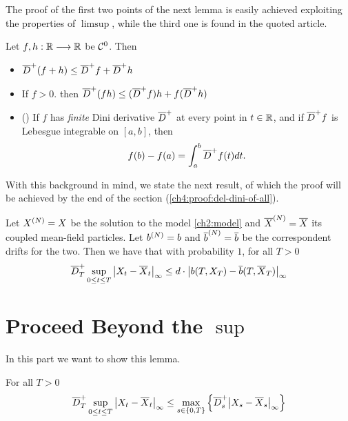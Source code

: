 The proof of the first two points of the next lemma is easily achieved exploiting the properties of $\limsup$, while the third one is found in the quoted article.

\begin{lemma}
	Let $f,h: \mathbb{R} \longrightarrow \mathbb{R}$ be $\mathcal{C}^0$.
	Then
	\begin{itemize}
		\item $\overline{D}^+ (f + h) \leq \overline{D}^+ f + \overline{D}^+h$
		\item If $f > 0$. then $\overline{D}^+ (fh) \leq (\overline{D}^+f) h + f(\overline{D}^+h)$
		\item (\autocite[Theorem 11]{dini-derivatives}) If $f$ has \emph{finite} Dini derivative $\overline{D}^+$ at every point in $t\in\mathbb{R}$, and if $\overline{D}^+f$ is Lebesgue integrable on $[a,b]$, then
			\begin{equation}
				f(b) - f(a) = \int_a^b \overline{D}^+ f (t) dt.
			\end{equation}
	\end{itemize}
\end{lemma}

With this background in mind, we state the next result, of which the proof will be achieved by the end of the section (\ref{ch4:proof:del-dini-of-all}).

\begin{lemma}\label{ch4:lemma:del-dini-of-all}
	Let $X^{(N)} = X$ be the solution to the model \ref{ch2:model} and $\overline{X}^{(N)} = \overline{X}$ its coupled mean-field particles.
	Let $b^{(N)}=b$ and $\overline{b}^{(N)} = \overline{b}$ be the correspondent drifts for the two.
	Then we have that with probability $1$, for all $T>0$
	\begin{equation}
		\overline{D}_T^+ \sup_{0 \leq t \leq T} { \left| X_t-\overline{X}_t \right|_{\infty} }
		\leq
		d \cdot 
			{ \left| b(T, X_T) - \overline{b}(T, \overline{X}_T) \right|_{\infty} }
	\end{equation}
\end{lemma}

\section{Proceed Beyond the $\sup$}

In this part we want to show this lemma.

\begin{lemma}\label{ch4:lemma:advance-after-sup}
	For all $T>0$
	\begin{equation}
		\overline{D}_T^+ \sup_{0 \leq t \leq T} { \left| X_t-\overline{X}_t \right|_{\infty} }
		\leq
		\max_{ s\in \{0,T\} } \left\{ 
		\overline{D}^+_s { \left| X_s-\overline{X}_s \right|_{\infty} }
		\right\}
	\end{equation}
\end{lemma}

